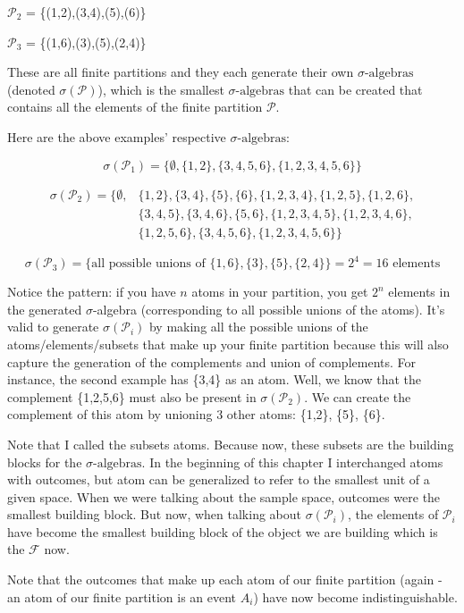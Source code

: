\documentclass[11pt]{article}
\newcommand{\sigalg}{\sigma\text{-algebras}}
\newcommand{\filt}{\mathcal{F}}
\begin{document}
$\mathcal{P}_2$ = \{(1,2),(3,4),(5),(6)\}

$\mathcal{P}_3$ = \{(1,6),(3),(5),(2,4)\}

These are all finite partitions and they each generate their own $\sigalg$ (denoted $\sigma(\mathcal{P})$), which is the smallest $\sigalg$ that can be created that contains all the elements of the finite partition $\mathcal{P}$.

Here are the above examples' respective $\sigalg$:

$$\sigma(\mathcal{P}_1) = \{\emptyset, \{1,2\}, \{3,4,5,6\}, \{1,2,3,4,5,6\}\}$$

\begin{align*}
\sigma(\mathcal{P}_2) = \big\{\emptyset, &\{1,2\}, \{3,4\}, \{5\}, \{6\}, \{1,2,3,4\}, \{1,2,5\}, \{1,2,6\}, \\
&\{3,4,5\}, \{3,4,6\}, \{5,6\}, \{1,2,3,4,5\}, \{1,2,3,4,6\}, \\
&\{1,2,5,6\}, \{3,4,5,6\}, \{1,2,3,4,5,6\}\big\}
\end{align*}

$$\sigma(\mathcal{P}_3) = \{\text{all possible unions of } \{1,6\}, \{3\}, \{5\}, \{2,4\}\} = 2^4 = 16 \text{ elements}$$

Notice the pattern: if you have $n$ atoms in your partition, you get $2^n$ elements in the generated $\sigma$-algebra (corresponding to all possible unions of the atoms). It's valid to generate $\sigma(\mathcal{P}_i)$ by making all the possible unions of the atoms/elements/subsets that make up your finite partition because this will also capture the generation of the complements and union of complements. For instance, the second example has \{3,4\} as an atom. Well, we know that the complement \{1,2,5,6\} must also be present in $\sigma(\mathcal{P}_2)$. We can create the complement of this atom by unioning 3 other atoms: \{1,2\}, \{5\}, \{6\}.

Note that I called the subsets atoms. Because now, these subsets are the building blocks for the $\sigalg$. In the beginning of this chapter I interchanged atoms with outcomes, but atom can be generalized to refer to the smallest unit of a given space. When we were talking about the sample space, outcomes were the smallest building block. But now, when talking about $\sigma(\mathcal{P}_i)$, the elements of $\mathcal{P}_i$ have become the smallest building block of the object we are building which is the $\filt$ now. 

Note that the outcomes that make up each atom of our finite partition (again - an atom of our finite partition is an event $A_i$) have now become indistinguishable. 
\end{document}
